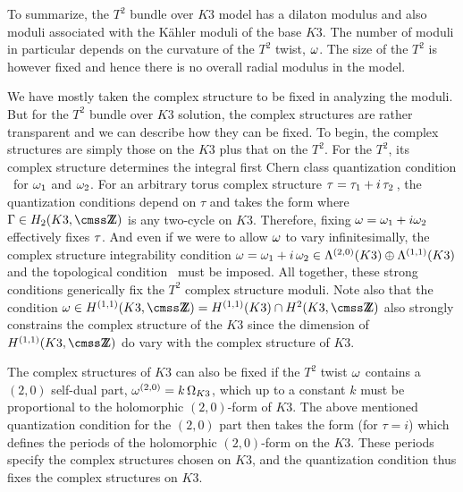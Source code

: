 To summarize, the $T^2$ bundle over $K3$ model has a dilaton
modulus and also moduli associated with the K\"ahler moduli of the
base $K3$.  The number of moduli in particular depends on the
curvature of the $T^2$ twist, $\omega$.  The size of the $T^2$ is
however fixed and hence there is no overall radial modulus in the
model.




We have mostly taken the complex structure to be fixed in
analyzing the moduli.  But for the $T^2$ bundle over $K3$
solution, the complex structures are rather transparent and we can
describe how they can be fixed.  To begin, the complex structures
are simply those on the $K3$ plus that on the $T^2$.  For the
$T^2$, its complex structure determines the integral first Chern
class quantization condition \bv\ for $\omega_1$ and $\omega_2$.  For an
arbitrary torus complex structure $\tau=\tau_1 + i\,\tau_2\,$, the
quantization conditions depend on $\tau$ and takes the form
\eqn{}
where $\G\in H_2(K3,\ZZ)$ is any two-cycle on $K3$.  Therefore, fixing $\omega = \omega_1 + i \omega_2$ effectively fixes $\tau$.  And even if we were to allow $\omega$ to vary infinitesimally, the complex structure integrability condition $\omega=\omega_1 + i \,\omega_2 \in \Lambda^{(2,0)}(K3) \oplus \Lambda^{(1,1)}(K3)$ and the topological condition \kfcon\ must be imposed.  All together, these strong conditions generically fix the $T^2$ complex structure moduli.  Note also that the condition $\om\in H^{(1,1)}(K3,\ZZ)=H^{(1,1)}(K3)\cap H^2(K3,\ZZ)$ also strongly constrains the complex structure of the $K3$ since the dimension of $H^{(1,1)}(K3,\ZZ)$ do vary with the complex structure of $K3$. 


The complex structures of $K3$ can also be fixed if the $T^2$
twist $\omega$ contains a $(2,0)$ self-dual part, $\omega^{(2,0)}=k\,
\Omega_{K3}$, which up to a constant $k$ must be proportional to the
holomorphic $(2,0)$-form of $K3$. The above mentioned quantization
condition for the $(2,0)$ part then takes the form (for $\tau=i$)
\eqn{}
which defines the periods of the holomorphic $(2,0)$-form on the
$K3$.  These periods specify the complex structures chosen on
$K3$, and the quantization condition thus fixes the complex
structures on $K3$.




